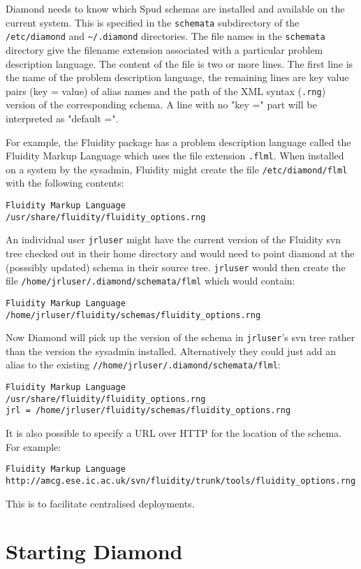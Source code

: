 Diamond needs to know which Spud schemas are installed and available on the
current system. This is specified in the \verb+schemata+ subdirectory of the
\verb+/etc/diamond+ and \verb+~/.diamond+ directories. The file names in the
\verb+schemata+ directory give the filename extension associated with a
particular problem description language. The content of the file is two or
more lines. The first line is the name of the problem description language,
the remaining lines are key value pairs (key = value) of alias names and the 
path of the XML syntax (\verb+.rng+) version of the corresponding schema.
A line with no "key =" part will be interpreted as "default =".

For example, the Fluidity package has a problem description language called
the Fluidity Markup Language which uses the file extension
\verb+.flml+. When installed on a system by the sysadmin, Fluidity might
create the file \verb+/etc/diamond/flml+ with the following contents:
\begin{verbatim}
Fluidity Markup Language
/usr/share/fluidity/fluidity_options.rng
\end{verbatim}
An individual user \verb+jrluser+ might have the current version of the
Fluidity svn tree checked out in their home directory and would need to
point diamond at the (posssibly updated) schema in their source
tree. \verb+jrluser+ would then create the file
\verb+/home/jrluser/.diamond/schemata/flml+ which would contain:
\begin{verbatim}
Fluidity Markup Language
/home/jrluser/fluidity/schemas/fluidity_options.rng
\end{verbatim}
Now Diamond will pick up the version of the schema in \verb+jrluser+'s svn
tree rather than the version the sysadmin installed.
Alternatively they could just add an alias to the existing \verb+//home/jrluser/.diamond/schemata/flml+:
\begin{verbatim}
Fluidity Markup Language
/usr/share/fluidity/fluidity_options.rng
jrl = /home/jrluser/fluidity/schemas/fluidity_options.rng
\end{verbatim}

It is also possible to specify a URL over HTTP for the location of the
schema. For example:
\begin{verbatim}
Fluidity Markup Language
http://amcg.ese.ic.ac.uk/svn/fluidity/trunk/tools/fluidity_options.rng
\end{verbatim}
This is to facilitate centralised deployments.

\section{Starting Diamond}

